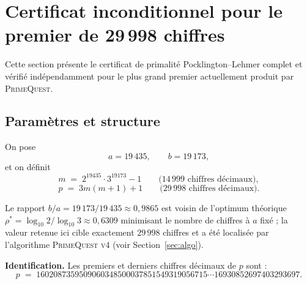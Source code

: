 %
%   
%
%

\section{Certificat inconditionnel pour le premier de 29\,998 chiffres}
\label{sec:cert29998}

Cette section présente le certificat de primalité Pocklington–Lehmer
complet et vérifié indépendamment pour le plus grand premier
actuellement produit par \textsc{PrimeQuest}.

\subsection{Paramètres et structure}

\begin{definition}\label{def:instance29998}
On pose
\[
  a = 19\,435,\qquad b = 19\,173,
\]
et on définit
\[
  m \;=\; 2^{19435}\cdot 3^{19173} - 1
    \qquad\bigl(14\,999 \text{ chiffres décimaux}\bigr),
\]
\[
  p \;=\; 3m(m+1)+1
    \qquad\bigl(29\,998 \text{ chiffres décimaux}\bigr).
\]
\end{definition}

Le rapport $b/a = 19\,173/19\,435 \approx 0{,}9865$ est voisin de l'optimum
théorique $\rho^* = \log_{10}2/\log_{10}3 \approx 0{,}6309$ minimisant le
nombre de chiffres à $a$ fixé ; la valeur retenue ici cible exactement
$29\,998$ chiffres et a été localisée par l'algorithme \textsc{PrimeQuest v4}
(voir Section~\ref{sec:algo}).

\medskip

\noindent\textbf{Identification.}\quad
Les premiers et derniers chiffres décimaux de $p$ sont :
\begin{equation}\label{eq:p29998chiffres}
  p \;=\; 1602087359509060348500037851549319056715\cdots
         16930852697403293697.
\end{equation}

